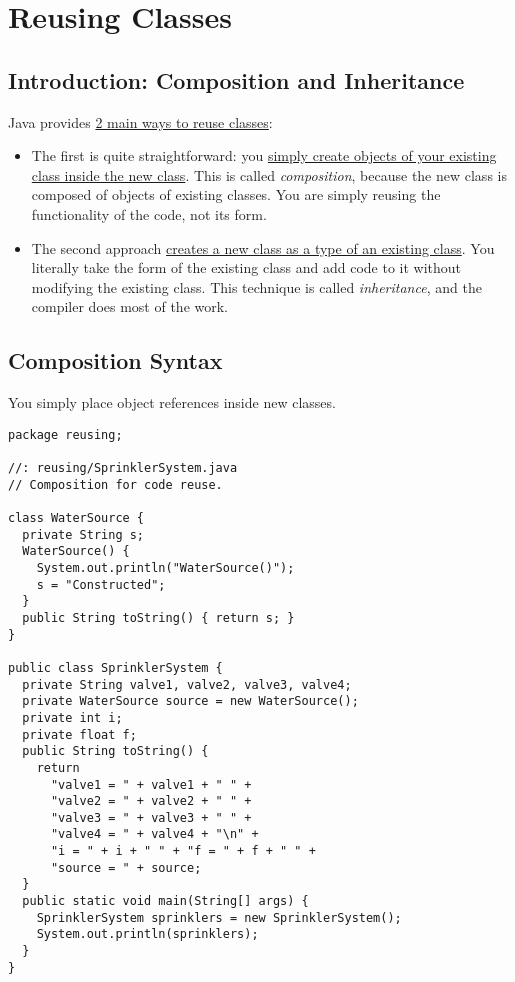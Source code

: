 \documentclass[10pt,letterpaper]{report}
\begin{document}
\chapter{Reusing Classes}
\section{Introduction: Composition and Inheritance}
Java provides \underline{2 main ways to reuse classes}:
\begin{itemize}
\item The first is quite straightforward: you \underline{simply create objects of your existing} \underline{class inside the new class}. This is called \textit{composition}, because the new class is composed of objects of existing classes. You are simply reusing the functionality of the code, not its form.
\item The second approach \underline{creates a new class as a type of an existing class}. You literally take the form of the existing class and add code to it without modifying the existing class. This technique is called \textit{inheritance}, and the compiler does most of the work.
\end{itemize}

\section{Composition Syntax}
You simply place object references inside new classes.

\begin{lstlisting}
package reusing;

//: reusing/SprinklerSystem.java
// Composition for code reuse.

class WaterSource {
  private String s;
  WaterSource() {
    System.out.println("WaterSource()");
    s = "Constructed";
  }
  public String toString() { return s; }
}	

public class SprinklerSystem {
  private String valve1, valve2, valve3, valve4;
  private WaterSource source = new WaterSource();
  private int i;
  private float f;
  public String toString() {
    return
      "valve1 = " + valve1 + " " +
      "valve2 = " + valve2 + " " +
      "valve3 = " + valve3 + " " +
      "valve4 = " + valve4 + "\n" +
      "i = " + i + " " + "f = " + f + " " +
      "source = " + source;
  }	
  public static void main(String[] args) {
    SprinklerSystem sprinklers = new SprinklerSystem();
    System.out.println(sprinklers);
  }
}
\end{lstlisting}
\end{document}

